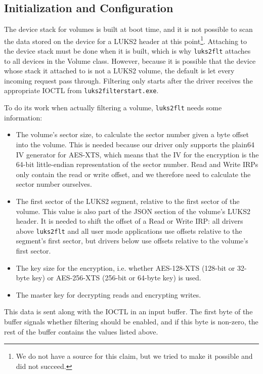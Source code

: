 
\subsection{Initialization and Configuration}
\label{chap:ourapproach.final.init}
The device stack for volumes is built at boot time, and it is not possible to scan the data stored on the device for a LUKS2 header at this point\footnote{\label{fn:ourapproach.final.readatboot} We do not have a source for this claim, but we tried to make it possible and did not succeed.}. Attaching to the device stack must be done when it is built, which is why \texttt{luks2flt} attaches to all devices in the Volume class. However, because it is possible that the device whose stack it attached to is not a LUKS2 volume, the default is let every incoming request pass through. Filtering only starts after the driver receives the appropriate IOCTL from \texttt{luks2filterstart.exe}.

To do its work when actually filtering a volume, \texttt{luks2flt} needs some information:
\begin{itemize}
	\item The volume's sector size, to calculate the sector number given a byte offset into the volume. This is needed because our driver only supports the plain64 IV generator for AES-XTS, which means that the IV for the encryption is the 64-bit little-endian representation of the sector number. Read and Write IRPs only contain the read or write offset, and we therefore need to calculate the sector number ourselves.
	\item The first sector of the LUKS2 segment, relative to the first sector of the volume. This value is also part of the JSON section of the volume's LUKS2 header. It is needed to shift the offset of a Read or Write IRP: all drivers above \texttt{luks2flt} and all user mode applications use offsets relative to the segment's first sector, but drivers below use offsets relative to the volume's first sector.
	\item The key size for the encryption, i.e. whether AES-128-XTS (128-bit or 32-byte key) or AES-256-XTS (256-bit or 64-byte key) is used.
	\item The master key for decrypting reads and encrypting writes.
\end{itemize}
This data is sent along with the IOCTL in an input buffer. The first byte of the buffer signals whether filtering should be enabled, and if this byte is non-zero, the rest of the buffer contains the values listed above.

